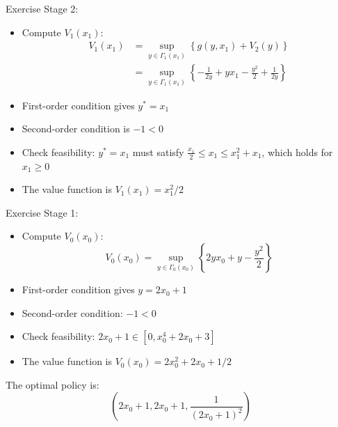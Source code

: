 \documentclass[9pt,aspectratio=169]{beamer}
\begin{document}
\begin{frame}{Exercise}
    Stage 2:
    \begin{itemize}
        \item Compute $V_1(x_1)$:
        \begin{align*}
            V_1(x_1) &= \sup_{y \in \Gamma_1(x_1)} \left\{g(y, x_1) + V_2(y)\right\}\\
            &= \sup_{y \in \Gamma_1(x_1)} \left\{-\frac{1}{2y} + yx_1 -
                \frac{y^2}{2} + \frac{1}{2y}\right\}
        \end{align*}
        \item First-order condition gives $y^* = x_1$
        \item Second-order condition is $-1 < 0$
        \item Check feasibility: $y^* = x_1$ must satisfy $\frac{x_1}{2} \leq
        x_1 \leq x_1^2 + x_1$, which holds for $x_1 \geq 0$
        \item The value function is $V_1(x_1) = x_1^2/2$
    \end{itemize}
\end{frame}

\begin{frame}{Exercise}
    Stage 1:
    \begin{itemize}
        \item Compute $V_0(x_0)$:
        \begin{equation*}
            V_0(x_0) = \sup_{y \in \Gamma_0(x_0)} \left\{2yx_0 + y -
                \frac{y^2}{2}\right\}
        \end{equation*}
        \item First-order condition gives $y = 2x_0 + 1$
        \item Second-order condition: $-1 < 0$
        \item Check feasibility: $2x_0 + 1 \in [0, x_0^4 + 2x_0 + 3]$
        \item The value function is $V_0(x_0) = 2x_0^2 + 2x_0 + 1/2$
    \end{itemize}
    The optimal policy is:
    \begin{equation*}
        \left(2x_0 + 1, 2x_0 + 1, \frac{1}{(2x_0 + 1)^2}\right)        
    \end{equation*}
\end{frame}
\end{document}
